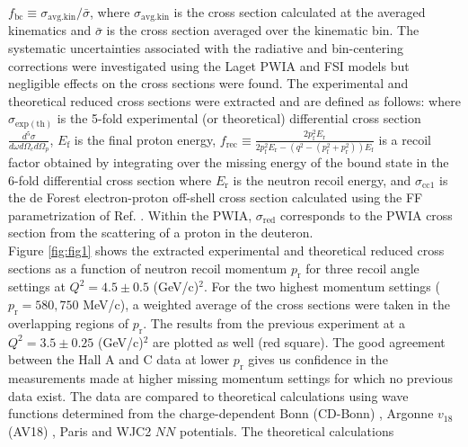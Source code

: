 \documentclass[aps,prl,twocolumn,showpacs,superscriptaddress,groupedaddress,nofootinbib]{revtex4-2}  %
\begin{document}
$f_{\mathrm{bc}} \equiv \sigma_{\mathrm{avg.kin}} / \bar{\sigma}$, where $\sigma_{\mathrm{avg.kin}}$ is the cross section calculated at the averaged kinematics and $\bar{\sigma}$ is the cross section averaged
over the kinematic bin. The systematic uncertainties associated with the radiative and bin-centering corrections were investigated using the Laget PWIA and FSI models but negligible effects on the cross sections were found. The experimental and theoretical reduced cross sections were extracted and are defined as follows:
\noindent where $\sigma_{\mathrm{exp(th)}}$ is the 5-fold experimental (or theoretical) differential cross section $\frac{d^{5}\sigma}{d\omega d\Omega_{e} d\Omega_{p}}$,
$E_{\mathrm{f}}$ is the final proton energy, $f_{\mathrm{rec}}\equiv \frac{2p_{\mathrm{f}}^{2}E_{\mathrm{r}}}{2p_{\mathrm{f}}^{2}E_{\mathrm{r}} - (q^{2} - (p_{\mathrm{f}}^{2} + p_{\mathrm{r}}^{2}))E_{\mathrm{f}}}$
is a recoil factor obtained by integrating over the missing energy of the bound state in the 6-fold differential cross section where $E_{\mathrm{r}}$ is the neutron recoil energy, and $\sigma_{\mathrm{cc1}}$ is the
de Forest \cite{DEFOREST1983} electron-proton off-shell cross section calculated using the FF parametrization of Ref. \cite{PhysRevC.69.022201}.
Within the PWIA, $\sigma_{\mathrm{red}}$ corresponds to the PWIA cross section from the scattering of a proton in the deuteron. \\
\indent Figure \ref{fig:fig1} shows the extracted experimental and theoretical reduced cross sections as a function of neutron recoil momentum
$p_{\mathrm{r}}$ for three recoil angle settings at $Q^{2}=4.5\pm0.5$ (GeV/c)$^{2}$. For the two highest momentum settings ($p_{\mathrm{r}}=580, 750$ MeV/c), a weighted average of the cross sections were taken in the overlapping regions of $p_{\mathrm{r}}$. The results from the previous experiment \cite{PhysRevLett.107.262501} at a $Q^{2}=3.5\pm0.25$ (GeV/c)$^{2}$ are plotted as well (red square). The good agreement between the Hall A and C data at lower $p_{\mathrm{r}}$
gives us confidence in the measurements made at higher missing momentum settings for which no previous data exist. The data are compared to theoretical calculations using wave functions determined from the charge-dependent Bonn (CD-Bonn) \cite{PhysRevC.63.024001}, Argonne $v_{18}$ (AV18) \cite{PhysRevC.51.38}, Paris \cite{PhysRevC.21.861} and WJC2 \cite{Gross_2007} $NN$ potentials. The theoretical calculations
\end{document}
